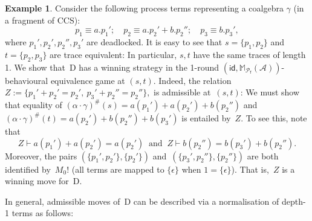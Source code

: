 \documentclass[sigconf,
			final%
			nonacm
                        ]{acmart}
\numberwithin{equation}{section}
\numberwithin{equation}{section}
\theoremstyle{plain}
\theoremstyle{definition}
\newtheorem{expl}[thm]{Example}
\newcommand{\id}{\mathsf{id}}
\newcommand{\M}{\mathbb{M}}                   %
\newcommand{\A}{\mathcal{A}}            %
\newcommand{\pow}{\mathscr P}              %
\newcommand{\powf}{\pow_{\mathsf f}}
\begin{document}
\begin{expl}
  Consider the following process terms representing a coalgebra
  $\gamma$ (in a fragment of CCS):
  \[
  p_1\equiv a.p_1';
  \quad
  p_2\equiv a.p_2' + b.p_2'';
  \quad
  p_3\equiv b.p_3',
  \]
  where $p_1',p_2',p_2'',p_3'$ are deadlocked. It is easy to see that
  $s=\{p_1,p_2\}$ and $t=\{p_2,p_3\}$ are trace equivalent: In
  particular, $s,t$ have the same traces of length 1. We show that~D
  has a winning strategy in the 1-round
  $(\id, \M_{\powf}(\A))$-behavioural equivalence game at
  $(s,t)$. Indeed, the relation
  \( Z := \{p_1' + p_2' = p_2',\ p_3' + p_2'' = p_2'' \}, \)
  is admissible at~$(s, t)$: We must show that equality of
  $(\alpha\cdot\gamma)^\#(s)=a(p_1') + a(p_2') + b(p_2'')$
  and~$(\alpha\cdot\gamma)^\#(t)=a(p_2') + b(p_2'') + b(p_3')$ is
  entailed by~$Z$. To see this, note that
  \[
  Z\vdash a(p_1') + a(p_2') = a(p_2')\ \text{ and }\ Z\vdash b(p_2'') = b(p_3') + b(p_2'').
  \]
  Moreover, the pairs $(\{p_1',p_2'\},\{p_2'\})$
  and~$(\{p_3',p_2''\},\{p_2''\})$ are both identified by~$M_0!$ (all
  terms are mapped to $\{\epsilon\}$ when $1=\{\epsilon\}$).  That
  is,~$Z$ is a winning move for~D.
\end{expl}
\noindent
In general, admissible moves of~D can be described via a normalisation
of depth-1 terms as follows:
\end{document}

